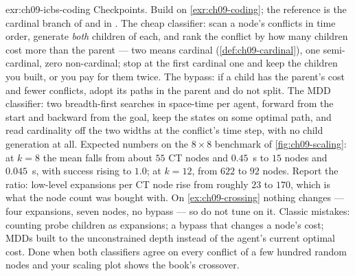 \begin{solution}{exr:ch09-icbs-coding}
Checkpoints. Build on \cref{exr:ch09-coding}; the reference is the cardinal branch of
 and  in . The cheap
classifier: scan a node's conflicts in time order, generate \emph{both} children of each,
and rank the conflict by how many children cost more than the parent --- two means
cardinal (\cref{def:ch09-cardinal}), one semi-cardinal, zero non-cardinal; stop at the
first cardinal one and keep the children you built, or you pay for them twice. The bypass:
if a child has the parent's cost and fewer conflicts, adopt its paths in the parent and do
not split. The MDD classifier: two breadth-first searches in space-time per agent, forward
from the start and backward from the goal, keep the states on some optimal path, and read
cardinality off the two widths at the conflict's time step, with no child generation at
all. Expected numbers on the $8\times8$ benchmark of \cref{fig:ch09-scaling}: at $k=8$ the
mean falls from about $55$ CT nodes and $0.45$~s to $15$ nodes and $0.045$~s, with success
rising to $1.0$; at $k=12$, from $622$ to $92$ nodes. Report the ratio: low-level
expansions per CT node rise from roughly $23$ to $170$, which is what the node count was
bought with. On \cref{ex:ch09-crossing} nothing changes --- four expansions, seven nodes,
no bypass --- so do not tune on it. Classic mistakes: counting probe children as
expansions; a bypass that changes a node's cost; MDDs built to the unconstrained depth
instead of the agent's current optimal cost. Done when both classifiers agree on every
conflict of a few hundred random nodes and your scaling plot shows the book's crossover.
\end{solution}
